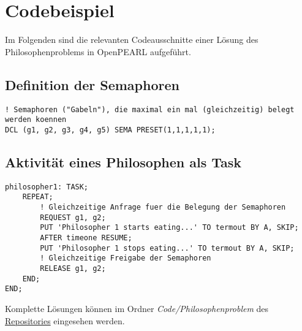 \newpage

\section{Codebeispiel}
	Im Folgenden sind die relevanten Codeausschnitte einer Lösung des Philosophenproblems in OpenPEARL aufgeführt.
	
\subsection{Definition der Semaphoren}
	\begin{lstlisting}
! Semaphoren ("Gabeln"), die maximal ein mal (gleichzeitig) belegt werden koennen
DCL (g1, g2, g3, g4, g5) SEMA PRESET(1,1,1,1,1);
	\end{lstlisting}
	
\subsection{Aktivität eines Philosophen als Task}
	\begin{lstlisting}
philosopher1: TASK;
	REPEAT;
		! Gleichzeitige Anfrage fuer die Belegung der Semaphoren
		REQUEST g1, g2;
		PUT 'Philosopher 1 starts eating...' TO termout BY A, SKIP;
		AFTER timeone RESUME;
		PUT 'Philosopher 1 stops eating...' TO termout BY A, SKIP;
		! Gleichzeitige Freigabe der Semaphoren
		RELEASE g1, g2;
	END;
END;
	\end{lstlisting}
	
	Komplette Lösungen können im Ordner \emph{Code/Philosophenproblem} des \href{https://github.com/OpenPearl-HFUWPV1718/SensorCar}{Repositories} eingesehen werden.\\